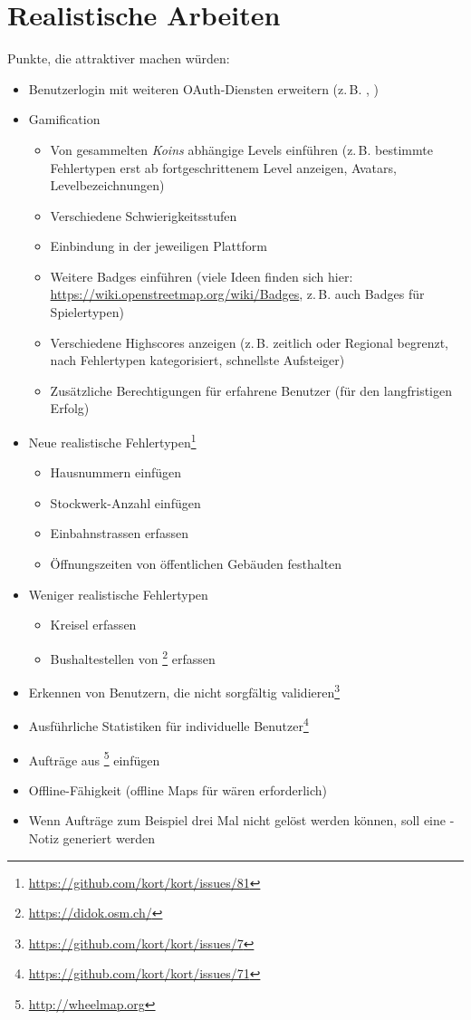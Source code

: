 \section{Realistische Arbeiten}
\label{pd-weiterentwicklung-realistisch}
Punkte, die \kort{} attraktiver machen würden:

\begin{itemize}
	\item Benutzerlogin mit weiteren \gls{OAuth}-Diensten erweitern (z.\,B. , )
	\item \gls{Gamification}
	\begin{itemize}
		\item Von gesammelten \emph{Koins} abhängige Levels einführen (z.\,B. bestimmte Fehlertypen erst ab fortgeschrittenem Level anzeigen, Avatars, Levelbezeichnungen)
		\item Verschiedene Schwierigkeitsstufen
		\item Einbindung in  der jeweiligen Plattform
		\item Weitere Badges einführen (viele Ideen finden sich hier: \url{https://wiki.openstreetmap.org/wiki/Badges}, z.\,B. auch Badges für Spielertypen)
		\item Verschiedene Highscores anzeigen (z.\,B. zeitlich oder Regional begrenzt, nach Fehlertypen kategorisiert, schnellste Aufsteiger)
		\item Zusätzliche Berechtigungen für erfahrene Benutzer (für den langfristigen Erfolg)
	\end{itemize}
	\item Neue realistische Fehlertypen\footnote{\url{https://github.com/kort/kort/issues/81}}
	\begin{itemize}
		\item Hausnummern einfügen
		\item Stockwerk-Anzahl einfügen
		\item Einbahnstrassen erfassen
		\item Öffnungszeiten von öffentlichen Gebäuden festhalten
	\end{itemize}
	\item Weniger realistische Fehlertypen
		\begin{itemize}
			\item Kreisel erfassen
			\item Bushaltestellen von \footnote{\url{https://didok.osm.ch/}} erfassen
		\end{itemize}
	\item Erkennen von Benutzern, die nicht sorgfältig validieren\footnote{\url{https://github.com/kort/kort/issues/7}}
	\item Ausführliche Statistiken für individuelle Benutzer\footnote{\url{https://github.com/kort/kort/issues/71}}
	\item Aufträge aus \footnote{\url{http://wheelmap.org}}	einfügen
	\item Offline-Fähigkeit (offline Maps für  wären erforderlich)
	\item Wenn Aufträge zum Beispiel drei Mal nicht gelöst werden können, soll eine -Notiz generiert werden
\end{itemize}

